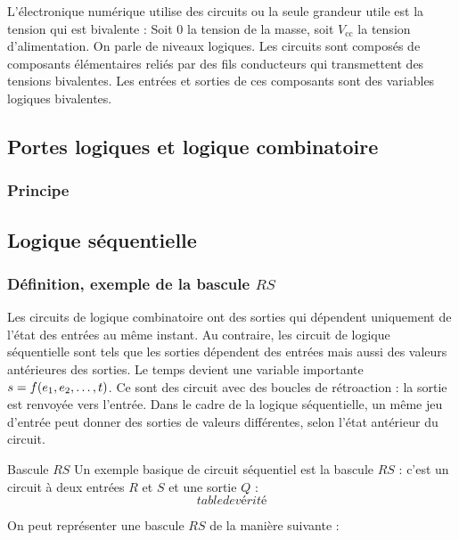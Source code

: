 \documentclass[a4paper,french,bookmarks]{book}
\begin{document}
    L'électronique numérique utilise des circuits ou la seule grandeur utile est la tension qui est bivalente : Soit $0$ la tension de la masse, soit $V_\text{cc}$ la tension d'alimentation. On parle de niveaux logiques. Les circuits sont composés de composants élémentaires reliés par des fils conducteurs qui transmettent des tensions bivalentes. Les entrées et sorties de ces composants sont des variables logiques bivalentes.
    
    \subsection{Portes logiques et logique combinatoire}
    
    \subsubsection{Principe}
    
    \subsection{Logique séquentielle}
    
    \subsubsection{Définition, exemple de la bascule $RS$}
    
    Les circuits de logique combinatoire ont des sorties qui dépendent uniquement de l'état des entrées au même instant. Au contraire, les circuit de logique séquentielle sont tels que les sorties dépendent des entrées mais aussi des valeurs antérieures des sorties. Le temps devient une variable importante $s = f\p{e_1, e_2, \dots, t}$. Ce sont des circuit avec des boucles de rétroaction : la sortie est renvoyée vers l'entrée. Dans le cadre de la logique séquentielle, un même jeu d'entrée peut donner des sorties de valeurs différentes, selon l'état antérieur du circuit.
    
    \begin{definition}{Bascule $RS$}{}
        Un exemple basique de circuit séquentiel est la bascule $RS$ : c'est un circuit à deux entrées $R$ et $S$ et une sortie $Q$ :
        \[ table de vérité \]
    \end{definition}
    On peut représenter une bascule $RS$ de la manière suivante :
    \begin{center}
        \begin{tikzpicture}
            
        \end{tikzpicture}
    \end{center}
    
\end{document}
